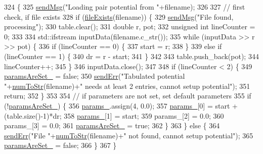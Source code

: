\begin{DoxyCode}
324                                                 \{
325     \hyperlink{utilities_8cpp_a08974c73a5b36c28b8ad1ef47fca77b0}{sendMsg}(\textcolor{stringliteral}{"Loading pair potential from "}+filename);
326 
327     \textcolor{comment}{// first check, if file exists}
328     \textcolor{keywordflow}{if} (\hyperlink{utilities_8cpp_a9d1e3672fd331d4185c1763c80226307}{fileExists}(filename)) \{
329         \hyperlink{utilities_8cpp_a08974c73a5b36c28b8ad1ef47fca77b0}{sendMsg}(\textcolor{stringliteral}{"File found, processing"});
330         table.clear();
331         \textcolor{keywordtype}{double} r, pot;
332         \textcolor{keywordtype}{unsigned} \textcolor{keywordtype}{int} lineCounter = 0;
333 
334         std::ifstream inputData(filename.c\_str());
335         \textcolor{keywordflow}{while} (inputData >> r >> pot) \{
336             \textcolor{keywordflow}{if} (lineCounter == 0) \{
337                 start = r;
338             \}
339             \textcolor{keywordflow}{else} \textcolor{keywordflow}{if} (lineCounter == 1) \{
340                 dr = r - start;
341             \}
342 
343             table.push\_back(pot);
344             lineCounter++;
345         \}
346         inputData.close();
347 
348         \textcolor{keywordflow}{if} (lineCounter < 2) \{
349             \hyperlink{classpair_potential_a635755c0a952bfc05a4cfae230c3dbd2}{paramsAreSet\_} = \textcolor{keyword}{false};
350             \hyperlink{utilities_8cpp_a6dacf3c3c19aa1e13a4d5a148fe5114e}{sendErr}(\textcolor{stringliteral}{"Tabulated potential "}+\hyperlink{utilities_8h_ae6ed8fadf719af789711a7c0e99f44bc}{numToStr}(filename)+\textcolor{stringliteral}{" needs at least 2 entries,
       cannot setup potential"});
351             \textcolor{keywordflow}{return};
352         \}
353 
354         \textcolor{comment}{// if parameters are not set, set default parameters}
355         \textcolor{keywordflow}{if} (!\hyperlink{classpair_potential_a635755c0a952bfc05a4cfae230c3dbd2}{paramsAreSet\_}) \{
356             \hyperlink{classpair_potential_abf8ec8af983d6e9960bd149da099e883}{params\_}.assign(4, 0.0);
357             \hyperlink{classpair_potential_abf8ec8af983d6e9960bd149da099e883}{params\_}[0] = start + (table.size()-1)*dr;
358             \hyperlink{classpair_potential_abf8ec8af983d6e9960bd149da099e883}{params\_}[1] = start;
359             params\_[2] = 0.0;
360             params\_[3] = 0.0;
361             \hyperlink{classpair_potential_a635755c0a952bfc05a4cfae230c3dbd2}{paramsAreSet\_} = \textcolor{keyword}{true};
362         \}
363     \} \textcolor{keywordflow}{else} \{
364         \hyperlink{utilities_8cpp_a6dacf3c3c19aa1e13a4d5a148fe5114e}{sendErr}(\textcolor{stringliteral}{"File "}+\hyperlink{utilities_8h_ae6ed8fadf719af789711a7c0e99f44bc}{numToStr}(filename)+\textcolor{stringliteral}{" not found, cannot setup potential"});
365         \hyperlink{classpair_potential_a635755c0a952bfc05a4cfae230c3dbd2}{paramsAreSet\_} = \textcolor{keyword}{false};
366     \}
367 \}
\end{DoxyCode}
